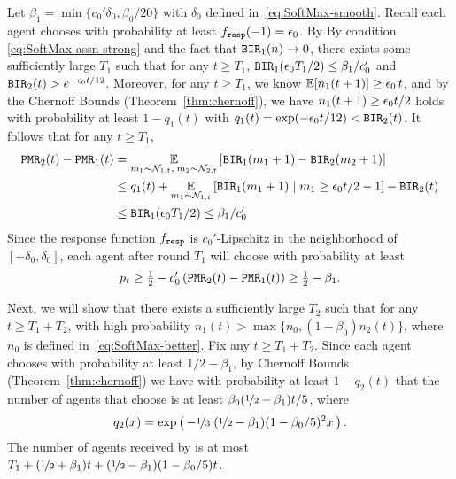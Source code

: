   Let $\beta_1 = \min\{c_0'\delta_0, \beta_0/20\}$ with $\delta_0$
  defined in~\eqref{eq:SoftMax-smooth}.  Recall each agent chooses
  \alg[1] with probability at least $f_{\mathtt{resp}}(-1)= \epsilon_0$.  By
By condition \eqref{eq:SoftMax-assn-strong} and the fact that
$\mathtt{BIR}_1(n) \to 0$,
  there exists some sufficiently large $T_1$ such that for any
  $t\geq T_1$, $\mathtt{BIR}_1(\epsilon_0 T_1/2) \leq \beta_1/c_0'$ and
  $\mathtt{BIR}_2(t) > e^{-\epsilon_0 t/12}$. Moreover, for any $t\geq T_1$, we
  know $\E[n_1(t+1)] \geq \eps_0\,t $, and by the Chernoff Bounds
  (Theorem~\ref{thm:chernoff}), we have $n_1(t+1) \geq \epsilon_0 t/2$
  holds with probability at least $1 - q_1(t)$ with
  $q_1(t) = \exp(-\epsilon_0 t/12) < \mathtt{BIR}_2(t)$. It follows that for any $t\geq T_1$,
\begin{align*}
  \mathtt{PMR}_2(t) - \mathtt{PMR}_1(t) &= \operatorname*{\mathbb{E}}_{m_1\sim \mathcal{N}_{1,t},\;m_2\sim \mathcal{N}_{2,t}}\left[\mathtt{BIR}_1(m_1+ 1) - \mathtt{BIR}_2(m_2+1)\right] \\
                        &\leq q_1(t)  + \operatorname*{\mathbb{E}}_{m_1\sim \mathcal{N}_{1,t}}\left[\mathtt{BIR}_1(m_1+ 1)\mid m_1 \geq \epsilon_0 t/2 - 1 \right] - \mathtt{BIR}_2(t)\\
                        &\leq \mathtt{BIR}_1(\epsilon_0 T_1/2) \leq \beta_1/c_0'
\end{align*}
Since the response function $f_{\mathtt{resp}}$ is $c_0'$-Lipschitz in the
neighborhood of $[-\delta_0, \delta_0]$, each agent after round $T_1$
will choose \alg[1] with probability at least
\[
  p_t \geq \tfrac{1}{2} - c_0'\left(\mathtt{PMR}_2(t) - \mathtt{PMR}_1(t)\right) \geq
  \tfrac{1}{2} - \beta_1.
\]

Next, we will show that there exists a sufficiently large $T_2$ such
that for any $t\geq T_1 + T_2$, with high probability
$n_1(t) > \max\{n_0, (1 - \beta_0)n_2(t)\}$, where $n_0$ is defined
in~\eqref{eq:SoftMax-better}. %
Fix any $t \geq T_1 + T_2$.
Since each agent chooses \alg[1] with probability at least
$1/2 - \beta_1$, by Chernoff Bounds (Theorem~\ref{thm:chernoff}) we
have with probability at least $1 - q_2(t)$ that the number of agents
that choose \alg[1] is at least
    $\beta_0(\nicefrac{1}{2} - \beta_1)t/5$,
where %
$$
q_2(x) = \exp\left(\, -\nicefrac{1}{3}\;
    (\nicefrac{1}{2} - \beta_1)(1 - \beta_0/5)^2x\,\right) .
$$
The number of agents received by \alg[2] is at most
$T_1 + (\nicefrac{1}{2} + \beta_1)t + (\nicefrac{1}{2} - \beta_1)(1 - \beta_0/5)t$.

